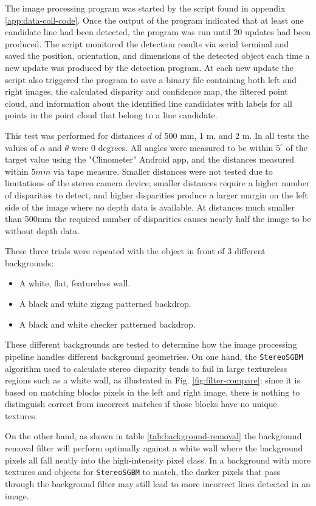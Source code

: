 The image processing program was started by the script found in appendix \ref{app:data-coll-code}. Once the output of the program indicated that at least one
candidate line had been detected, the program was run until 20 updates had been produced. The script monitored the detection results via serial terminal and saved the position, 
orientation, and dimensions of the detected object each time a new update was produced by the detection program. At each new update the script also triggered the
program to save a binary file containing both left and right images, the calculated disparity and confidence map, the filtered point cloud, and information about the 
identified line candidates with labels for all points in the point cloud that belong to a line candidate.

This test was performed for distances $d$ of 500 mm, 1 m, and 2 m. In all tests the values of $\alpha$ and $\theta$ were 0 degrees.
All angles were measured to be within $5^\circ$ of the target value using the "Clinometer" Android app,
and the distances measured within $5mm$ via tape measure. Smaller distances were not tested due to limitations of the stereo camera device; smaller distances require a higher number of disparities to detect,
and higher disparities produce a larger margin on the left side of the image where no depth data is available. At distances much smaller than 500mm the required number of disparities 
causes nearly half the image to be without depth data.


These three trials were repeated with the object in front of 3 different backgrounds:
\begin{itemize}
    \item A white, flat, featureless wall.
    \item A black and white zigzag patterned backdrop.
    \item A black and white checker patterned backdrop.
\end{itemize}
These different backgrounds are tested to determine how the image processing pipeline handles different background 
geometries. On one hand, the \texttt{StereoSGBM} algorithm used to calculate stereo disparity tends to fail in large 
textureless regions such as a white wall, as illustrated in Fig. \ref{fig:filter-compare}; since it is based on matching blocks pixels in the left and right image, 
there is nothing to distinguish correct from incorrect matches if those blocks have no unique textures. 

On the other hand, as shown in table \ref{tab:background-removal} the background removal filter will perform optimally 
against a white wall where the background pixels all fall neatly into the high-intensity pixel class. 
In a background with more textures and objects for \texttt{StereoSGBM} to match, the darker pixels that pass through the
background filter may still lead to more incorrect lines detected in an image.

